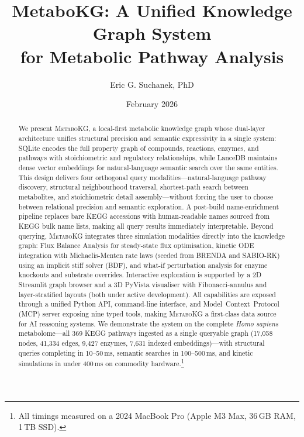 \documentclass[10pt]{article}
\title{\textbf{MetaboKG: A Unified Knowledge Graph System\\for Metabolic Pathway Analysis}}
\author[1]{Eric G. Suchanek, PhD}
\affil[1]{Flux Frontiers, \href{https://github.com/Flux-Frontiers}{github.com/Flux-Frontiers}}
\date{February 2026}
\begin{document}

\maketitle

\begin{abstract}
\noindent
We present \textsc{MetaboKG}, a local-first metabolic knowledge graph whose
dual-layer architecture unifies structural precision and semantic expressivity
in a single system: SQLite encodes the full property graph of compounds,
reactions, enzymes, and pathways with stoichiometric and regulatory
relationships, while LanceDB maintains dense vector embeddings for
natural-language semantic search over the same entities. This design delivers
four orthogonal query modalities---natural-language pathway discovery,
structural neighbourhood traversal, shortest-path search between metabolites,
and stoichiometric detail assembly---without forcing the user to choose between
relational precision and semantic exploration. A post-build name-enrichment
pipeline replaces bare KEGG accessions with human-readable names sourced from
KEGG bulk name lists, making all query results immediately interpretable.
Beyond querying, \textsc{MetaboKG} integrates three simulation modalities
directly into the knowledge graph: Flux Balance Analysis for steady-state flux
optimisation, kinetic ODE integration with Michaelis-Menten rate laws (seeded
from BRENDA and SABIO-RK) using an implicit stiff solver (BDF), and what-if
perturbation analysis for enzyme knockouts and substrate overrides. Interactive
exploration is supported by a 2D Streamlit graph browser and a 3D PyVista
visualiser with Fibonacci-annulus and layer-stratified layouts (both under
active development). All capabilities are exposed through a unified Python API,
command-line interface, and Model~Context~Protocol (MCP) server exposing nine
typed tools, making \textsc{MetaboKG} a first-class data source for AI reasoning
systems. We demonstrate the system on the complete \textit{Homo sapiens}
metabolome---all 369 KEGG pathways ingested as a single queryable graph
(17,058 nodes, 41,334 edges, 9,427 enzymes, 7,631 indexed embeddings)---with
structural queries completing in 10--50\,ms, semantic searches in
100--500\,ms, and kinetic simulations in under 400\,ms on commodity
hardware.\footnote{All timings measured on a 2024 MacBook Pro (Apple M3
Max, 36\,GB RAM, 1\,TB SSD).}
\end{abstract}
\end{document}
